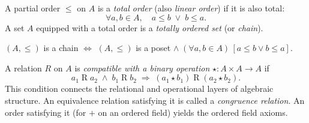 \begin{tcolorbox}[colback=propbox, colframe=propborder, arc=2pt,
  left=6pt, right=6pt, top=4pt, bottom=4pt,
  title={\small\textbf{Definition (Total Order)}},
  fonttitle=\small\bfseries]
\label{def:total-order}
A partial order $\leq$ on $A$ is a \emph{total order} (also
\emph{linear order}) if it is also total:
\[
  \forall a,b \in A,\quad a \leq b \;\lor\; b \leq a.
\]
A set $A$ equipped with a total order is a \emph{totally ordered set}
(or \emph{chain}).
\end{tcolorbox}

\begin{remark}
$(A, \leq)$ is a chain
$\iff$
$(A, \leq)$ is a poset
$\land\; (\forall a,b \in A)\,[a \leq b \lor b \leq a]$.
\end{remark}

\begin{remark}
A relation $R$ on $A$ is \emph{compatible with a binary operation}
$\star : A \times A \to A$ if
\[
  a_1 \mathrel{R} a_2 \;\land\; b_1 \mathrel{R} b_2
  \;\Rightarrow\;
  (a_1 \star b_1) \mathrel{R} (a_2 \star b_2).
\]
This condition connects the relational and operational layers of algebraic
structure.
An equivalence relation satisfying it is called a \emph{congruence relation}.
An order satisfying it (for $+$ on an ordered field) yields the ordered field
axioms.
\end{remark}